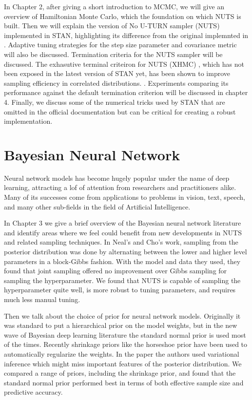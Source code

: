 \documentclass[]{report}
\begin{document}
In Chapter 2, after giving a short introduction to MCMC, we will give an overview of Hamiltonian Monte Carlo, which the foundation on which NUTS is built. Then we will explain the version of No U-TURN sampler (NUTS) implemented in STAN, highlighting its difference from the original implemnted in \cite{hoffman2014no}. Adaptive tuning strategies for the step size parameter and covariance metric will also be discussed. Termination criteria for the NUTS sampler will be discussed. The exhasutive terminal criteiron for NUTS (XHMC) , which has not been exposed in the latest version of STAN yet, has been shown to improve sampling efficiency in correlated distributions.  \cite{betancourt2016identifying}. Experiments comparing its performance against the default termination criterion will be discussed in chapter 4. Finally, we discuss some of the numerical tricks used by STAN that are omitted in the official documentation but can be critical for creating a robust implementation. 





\section{Bayesian Neural Network }

Neural network models has become hugely popular under the name of deep learning, attracting a lof of attention from researchers and practitioners alike. Many of its successes come from applications to problems in vision, text, speech, and many other sub-fields in the field of Artificial Intelligence. 


In Chapter 3 we give a brief overview of the Bayesian neural network literature and identify areas where we feel could benefit from new developments in NUTS and related sampling techniques. In Neal's and Cho's work, sampling from the posterior distribution was done by alternating between the lower and higher level parameters in a block-Gibbs fashion. With the model and data they used, they found that joint sampling offered no improvement over Gibbs sampling for sampling the hyperparameter. We found that NUTS is capable of sampling the hyperparameter quite well, is more robust to tuning parameters, and requires much less manual tuning. 

Then we talk about the choice of prior for neural network models. Originally it was standard to put a hierarchical prior on the model weights, but in the new wave of Bayesian deep learning literature the standard normal prior is used most of the times. Recently shrinkage priors like the horseshoe prior have been used to automatically regularize the weights. In the paper the authors used variational inference which might miss important features of the posterior distribution. We compared a range of priors, including the shrinkage prior, and found that the standard normal prior performed best in terms of both effective sample size and predictive accuracy. 
\end{document}
